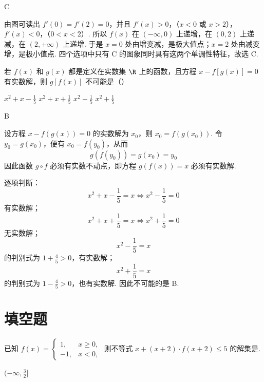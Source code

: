 \begin{answer}
C
\end{answer}

\begin{solution}
由图可读出 \(f'(0)=f'(2)=0\)，并且
\(f'(x)>0\)，（\(x<0\text{ 或 }x>2\)），\(f'(x)<0\)，（\(0<x<2\)）.
所以 \(f(x)\) 在 \((-\infty,0)\) 上递增，在 \((0,2)\) 上递减，在 \((2,+\infty)\) 上递增. 于是 \(x=0\) 处由增变减，是极大值点；\(x=2\) 处由减变增，是极小值点. 四个选项中只有 C 的图象同时具有这两个单调性特征，故选 C.
\end{solution}

\begin{problem}
若 \(f(x)\) 和 \(g(x)\) 都是定义在实数集 \(\R\) 上的函数，且方程 \(x-f[g(x)]=0\) 有实数解，则 \(g[f(x)]\) 不可能是（\quad）

\choices
    {\(x^2+x-\frac{1}{5}\)}
    {\(x^2+x+\frac{1}{5}\)}
    {\(x^2-\frac{1}{5}\)}
    {\(x^2+\frac{1}{5}\)}
\end{problem}

\begin{answer}
B
\end{answer}

\begin{solution}
设方程 \(x-f(g(x))=0\) 的实数解为 \(x_0\)，则 \(x_0=f(g(x_0))\). 令 \(y_0=g(x_0)\)，便有 \(x_0=f(y_0)\)，从而
\[
g(f(y_0))=g(x_0)=y_0
\]
因此函数 \(g\circ f\) 必须有实数不动点，即方程 \(g(f(x))=x\) 必须有实数解.

逐项判断：
\[
x^2+x-\frac15=x\iff x^2-\frac15=0
\]
有实数解；
\[
x^2+x+\frac15=x\iff x^2+\frac15=0
\]
无实数解；
\[
x^2-\frac15=x
\]
的判别式为 \(1+\frac45>0\)，有实数解；
\[
x^2+\frac15=x
\]
的判别式为 \(1-\frac45>0\)，也有实数解. 因此不可能的是 B.
\end{solution}

\section{填空题}
\begin{problem}
已知 \(f(x)=\begin{cases}
1,&x\geqslant0,\\
-1,&x<0,
\end{cases}\) 则不等式 \(x+(x+2)\cdot f(x+2)\leqslant5\) 的解集是\fillinblank{}.
\end{problem}

\begin{answer}
\((-\infty,\frac{3}{2}]\)
\end{answer}


